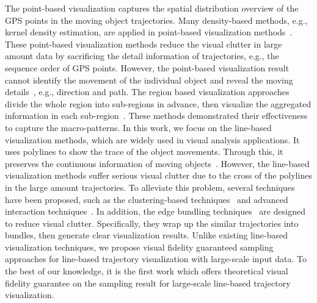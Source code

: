 The point-based visualization captures the spatial distribution overview of the GPS points in the moving object trajectories.
Many density-based methods, e.g., kernel density estimation, are applied in point-based visualization methods~\cite{liu2013vait,yang2016exploring,chae2014public,xie2008kernel, borruso2008network}.
These point-based visualization methods reduce the visual clutter in large amount data by sacrificing the detail information of trajectories, e.g., the sequence order of GPS points.
However, the point-based visualization result cannot identify the movement of the individual object and reveal the moving details~\cite{chen2015survey}, e.g.,  direction and path.
The region based visualization approaches divide the whole region into sub-regions in advance, then visualize the aggregated information in each sub-region~\cite{guo2009flow,wood2010visualisation,von2015mobilitygraphs}.
These methods demonstrated their effectiveness to capture the macro-patterns.
In this work, we focus on the line-based visualization methods, which are widely used in visual analysis applications.
It uses polylines to show the trace of the object movements.
Through this, it preserves the continuous information of moving objects~\cite{guo2011tripvista,hurter2009fromdady}.
However, the line-based visualization methods suffer serious visual clutter due to the cross of the polylines in the large amount trajectories.
To alleviate this problem, several techniques have been proposed, such as the clustering-based techniques~\cite{ferreira2013vector, rinzivillo2008visually, von2015mobilitygraphs} and advanced interaction techniques~\cite{kruger2013trajectorylenses, ferreira2013visual}.
In addition, the edge bundling techniques~\cite{zeng2019route,thony2015vector} are designed to reduce visual clutter.
Specifically, they wrap up the similar trajectories into bundles, then generate clear visualization results.
Unlike existing line-based visualization techniques, we propose visual fidelity  guaranteed sampling approaches for line-based trajectory visualization with large-scale input data.
To the best of our knowledge, it is the first work which offers theoretical visual fidelity guarantee on the sampling result for large-scale line-based trajectory visualization.






